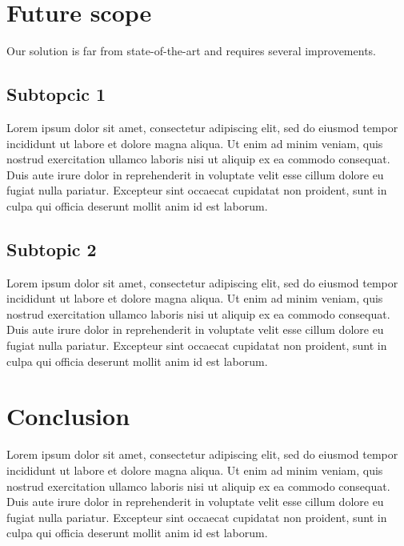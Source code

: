 \documentclass[a4paper,12 pt,oneside]{book}
\begin{document}
\chapter{Future scope}

Our solution is far from state-of-the-art and requires several improvements. 

\section{Subtopcic 1}
Lorem ipsum dolor sit amet, consectetur adipiscing elit, sed do eiusmod tempor incididunt ut labore et dolore magna aliqua. Ut enim ad minim veniam, quis nostrud exercitation ullamco laboris nisi ut aliquip ex ea commodo consequat. Duis aute irure dolor in reprehenderit in voluptate velit esse cillum dolore eu fugiat nulla pariatur. Excepteur sint occaecat cupidatat non proident, sunt in culpa qui officia deserunt mollit anim id est laborum.

\section{Subtopic 2}
Lorem ipsum dolor sit amet, consectetur adipiscing elit, sed do eiusmod tempor incididunt ut labore et dolore magna aliqua. Ut enim ad minim veniam, quis nostrud exercitation ullamco laboris nisi ut aliquip ex ea commodo consequat. Duis aute irure dolor in reprehenderit in voluptate velit esse cillum dolore eu fugiat nulla pariatur. Excepteur sint occaecat cupidatat non proident, sunt in culpa qui officia deserunt mollit anim id est laborum.


\chapter{Conclusion}

Lorem ipsum dolor sit amet, consectetur adipiscing elit, sed do eiusmod tempor incididunt ut labore et dolore magna aliqua. Ut enim ad minim veniam, quis nostrud exercitation ullamco laboris nisi ut aliquip ex ea commodo consequat. Duis aute irure dolor in reprehenderit in voluptate velit esse cillum dolore eu fugiat nulla pariatur. Excepteur sint occaecat cupidatat non proident, sunt in culpa qui officia deserunt mollit anim id est laborum.



\end{document}
